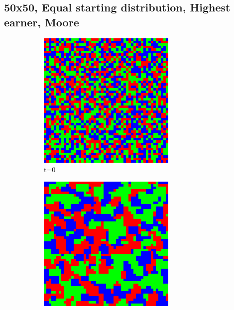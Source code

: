 \documentclass[a4paper, 11pt]{article}
\begin{document}
\newpage
\begin{landscape}
\subsection{50x50, Equal starting distribution, Highest earner, Moore}

\begin{figure}[H]
\centering
\begin{subfigure}{.20\textwidth}
  \centering
  \includegraphics[width=0.95\linewidth]{ROCK_PAPER_SCISSORS_MOORE_50x50_t00}
  \caption{t=0}
\end{subfigure}%
\begin{subfigure}{.20\textwidth}
  \centering
  \includegraphics[width=0.95\linewidth]{ROCK_PAPER_SCISSORS_MOORE_50x50_t01}

\end{subfigure}
\end{figure}
\end{landscape}
\end{document}

